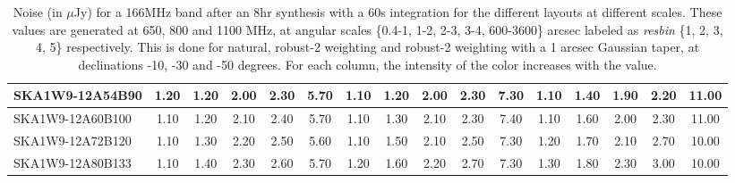 \begin{table}[H]
{{\begin{tabular}{|lccccc||ccccc||ccccc|}
SKA1W9-12A54B90 & 1.20 \cellcolor{blue!28.50} & 1.20 \cellcolor{red!18.00} & 2.00 \cellcolor{green!18.00} & 2.30 \cellcolor{orange!18.00} & 5.70 \cellcolor{purple!60.00} & 1.10 \cellcolor{blue!18.00} & 1.20 \cellcolor{red!18.00} & 2.00 \cellcolor{green!18.00} & 2.30 \cellcolor{orange!18.00} & 7.30 \cellcolor{purple!49.50} & 1.10 \cellcolor{blue!18.00} & 1.40 \cellcolor{red!18.00} & 1.90 \cellcolor{green!18.00} & 2.20 \cellcolor{orange!18.00} & 11.00 \cellcolor{purple!60.00}\\ \hline 
SKA1W9-12A60B100 & 1.10 \cellcolor{blue!18.00} & 1.20 \cellcolor{red!18.00} & 2.10 \cellcolor{green!28.50} & 2.40 \cellcolor{orange!32.00} & 5.70 \cellcolor{purple!60.00} & 1.10 \cellcolor{blue!18.00} & 1.30 \cellcolor{red!24.00} & 2.10 \cellcolor{green!32.00} & 2.30 \cellcolor{orange!18.00} & 7.40 \cellcolor{purple!60.00} & 1.10 \cellcolor{blue!18.00} & 1.60 \cellcolor{red!34.80} & 2.00 \cellcolor{green!28.50} & 2.30 \cellcolor{orange!23.25} & 11.00 \cellcolor{purple!60.00}\\ \hline 
SKA1W9-12A72B120 & 1.10 \cellcolor{blue!18.00} & 1.30 \cellcolor{red!24.00} & 2.20 \cellcolor{green!39.00} & 2.50 \cellcolor{orange!46.00} & 5.60 \cellcolor{purple!39.00} & 1.10 \cellcolor{blue!18.00} & 1.50 \cellcolor{red!36.00} & 2.10 \cellcolor{green!32.00} & 2.50 \cellcolor{orange!39.00} & 7.30 \cellcolor{purple!49.50} & 1.20 \cellcolor{blue!28.50} & 1.70 \cellcolor{red!43.20} & 2.10 \cellcolor{green!39.00} & 2.70 \cellcolor{orange!44.25} & 10.00 \cellcolor{purple!18.00}\\ \hline 
SKA1W9-12A80B133 & 1.10 \cellcolor{blue!18.00} & 1.40 \cellcolor{red!30.00} & 2.30 \cellcolor{green!49.50} & 2.60 \cellcolor{orange!60.00} & 5.70 \cellcolor{purple!60.00} & 1.20 \cellcolor{blue!28.50} & 1.60 \cellcolor{red!42.00} & 2.20 \cellcolor{green!46.00} & 2.70 \cellcolor{orange!60.00} & 7.30 \cellcolor{purple!49.50} & 1.30 \cellcolor{blue!39.00} & 1.80 \cellcolor{red!51.60} & 2.30 \cellcolor{green!60.00} & 3.00 \cellcolor{orange!60.00} & 10.00 \cellcolor{purple!18.00}\\ \hline 
\end{tabular}}
\vspace{-0.300000cm}
\hspace{1cm} 

\vspace{.25cm}
\caption{Noise (in $\mu$Jy) for a 166MHz band after an 8hr synthesis with a 60s integration for the different layouts at different scales. These values are generated at 650, 800 and 1100 MHz, at angular scales \{0.4-1, 1-2, 2-3, 3-4, 600-3600\} arcsec labeled as {\it resbin} \{1, 2, 3, 4, 5\} respectively. This is done for natural, robust-2 weighting and robust-2 weighting with a 1 arcsec Gaussian taper, at declinations -10, -30 and -50 degrees. For each column, the intensity of the color increases with the value.}\label{tab:noise166}}
 \end{table}
